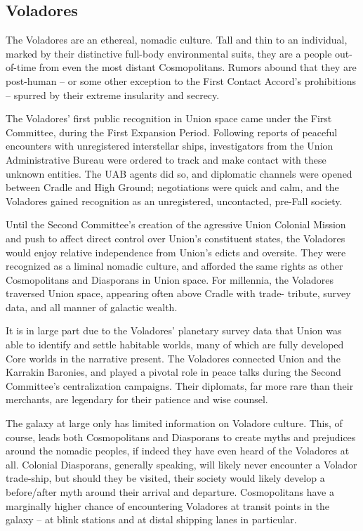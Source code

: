 \subsection{Voladores}

The Voladores are an ethereal, nomadic culture. Tall and thin to an individual, marked by their
distinctive full-body environmental suits, they are a people out-of-time from even the most
distant Cosmopolitans. Rumors abound that they are post-human -- or some other exception to
the First Contact Accord’s prohibitions -- spurred by their extreme insularity and secrecy.

The Voladores’ first public recognition in Union space came under the First Committee, during
the First Expansion Period. Following reports of peaceful encounters with unregistered
interstellar ships, investigators from the Union Administrative Bureau were ordered to track and
make contact with these unknown entities. The UAB agents did so, and diplomatic channels
were opened between Cradle and High Ground; negotiations were quick and calm, and the
Voladores gained recognition as an unregistered, uncontacted, pre-Fall society.

Until the Second Committee’s creation of the agressive Union Colonial Mission and push to
affect direct control over Union’s constituent states, the Voladores would enjoy relative
independence from Union’s edicts and oversite. They were recognized as a liminal nomadic
culture, and afforded the same rights as other Cosmopolitans and Diasporans in Union space.
For millennia, the Voladores traversed Union space, appearing often above Cradle with trade-
tribute, survey data, and all manner of galactic wealth.

It is in large part due to the Voladores’ planetary survey data that Union was able to identify and
settle habitable worlds, many of which are fully developed Core worlds in the narrative present.
The Voladores connected Union and the Karrakin Baronies, and played a pivotal role in peace
talks during the Second Committee’s centralization campaigns. Their diplomats, far more rare
than their merchants, are legendary for their patience and wise counsel.

The galaxy at large only has limited information on Voladore culture. This, of course, leads both
Cosmopolitans and Diasporans to create myths and prejudices around the nomadic peoples, if
indeed they have even heard of the Voladores at all. Colonial Diasporans, generally speaking, will
likely never encounter a Volador trade-ship, but should they be visited, their society would likely
develop a before/after myth around their arrival and departure. Cosmopolitans have a marginally
higher chance of encountering Voladores at transit points in the galaxy -- at blink stations and at
distal shipping lanes in particular.

